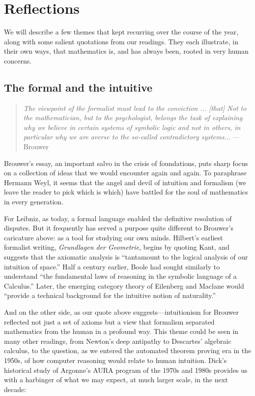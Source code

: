 \documentclass{article}
\begin{document}
 

 
\section{Reflections} \label{Reflections}
We will describe a few themes that kept recurring over the course of the year, along with some salient quotations from our readings. They each illustrate, in their own ways, that mathematics is, and has always been, rooted in very human concerns.

  

\subsection{The formal and the intuitive}
   \begin{quote}
{\em The viewpoint of the formalist must lead to the conviction ... [that] Not to the mathematician, but to the psychologist, belongs the task of explaining why we believe in certain systems of symbolic logic and not in others, in particular why we are averse to the so-called contradictory systems...} ---Brouwer \cite{brouwer_intuitionism}
  \end{quote}


 Brouwer’s essay, an important salvo in the crisis of foundations, puts sharp focus on a collection of ideas that we would encounter again and again. To paraphrase Hermann Weyl, it seems that the angel and devil of intuition and formalism (we leave the reader to pick which is which) have battled for the soul of mathematics in every generation.
 
For Leibniz, as today, a formal language enabled the definitive resolution of disputes. But it frequently has served a purpose quite different to Brouwer’s caricature above: as a tool for studying our own minds. Hilbert’s earliest formalist writing,  {\em Grundlagen der Geometrie},  begins by quoting Kant, and suggests that the axiomatic analysis is “tantamount to the logical analysis of our intuition of space.” Half a century earlier, Boole had sought similarly to understand “the fundamental laws of reasoning in the symbolic language of a Calculus.” Later, the emerging category theory of Eilenberg and Maclane would “provide a technical background for the intuitive notion of naturality.”

And on the other side, as our quote above suggests—intuitionism for Brouwer reflected not just a set of axioms but a view that formalism separated mathematics from the human in a profound way. This theme could be seen in many other readings, from Newton’s deep antipathy to Descartes’ algebraic calculus, to the question, as we entered the  automated theorem proving era in the 1950s, of how computer reasoning would relate to human intuition. Dick’s historical study \cite{dick_aftermath} of Argonne’s AURA program of the 1970s and 1980s provides us with a harbinger of what we may expect, at much larger scale, in the next decade:
\end{document}
